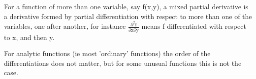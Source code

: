 For a function of more than one variable, say f(x,y), a mixed partial derivative
is a derivative formed by partial differentiation with respect to more than one of 
the variables, one after another, for instance 
$ \frac{ \partial ^2 \mathrm{f}}{ \partial \mathrm{x} \partial \mathrm{y} } $
means f differentiated with respect to x, and then y.
\par
For analytic functions (ie most 'ordinary' functions) the order of the
differentiations does not matter, but for some unusual functions this is not the case.